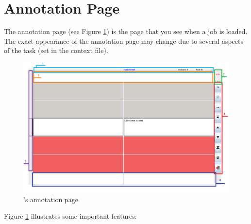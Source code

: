 \section{Annotation Page}

The annotation page (see Figure \ref{fig:annotation}) is the page that you see when a job is loaded.
The exact appearance of the annotation page may change due to several aspects of the task (set in the context file).

\begin{figure}[h]\label{fig:annotation}
\includegraphics[width=1.0\textwidth]{img/annotation-page-colors}
\caption{\PET's annotation page}
\end{figure}

Figure \ref{fig:annotation} illustrates some important features:

